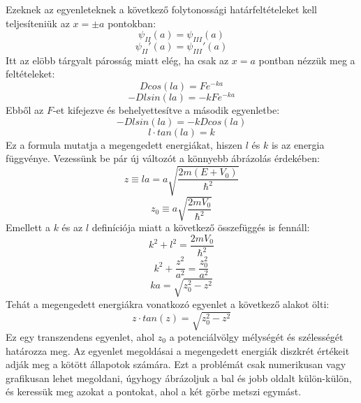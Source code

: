 \documentclass[a4paper,12pt]{article}
\begin{document}
Ezeknek az egyenleteknek a következő folytonossági határfeltételeket kell teljesíteniük az $x = \pm a$ pontokban:
\begin{equation}
    \psi_{II}(a) = \psi_{III}(a)
\end{equation}
\begin{equation}
    \psi_{II}'(a) = \psi_{III}'(a)
\end{equation}
Itt az elöbb tárgyalt párosság miatt elég, ha csak az $x = a$ pontban nézzük meg a feltételeket:
\begin{equation}
    D cos(l a) = F e^{- k a}
\end{equation}
\begin{equation}
    - D l sin(l a) = - k F e^{- k a}
\end{equation}
Ebből az $F$-et kifejezve és behelyettesítve a második egyenletbe:
\begin{equation}
    - D l sin(l a) = - k D cos(l a)
\end{equation}
\begin{equation}
    l \cdot tan(l a) = k
\end{equation}
Ez a formula mutatja a megengedett energiákat, hiszen $l$ és $k$ is az energia függvénye. Vezessünk be pár új változót a könnyebb ábrázolás érdekében:
\begin{equation}
    z \equiv l a = a \sqrt{\frac{2m(E + V_0)}{\hbar^2}}
\end{equation}
\begin{equation}
    z_0 \equiv a \sqrt{\frac{2m V_0}{\hbar^2}}
\end{equation}
Emellett a $k$ és az $l$ definíciója miatt a következő összefüggés is fennáll:
\begin{equation}
    k^2 + l^2 = \frac{2m V_0}{\hbar^2}
\end{equation}
\begin{equation}
    k^2 + \frac{z^2}{a^2} = \frac{z_0^2}{a^2}
\end{equation}
\begin{equation}
    ka = \sqrt{z_0^2 - z^2}
\end{equation}
Tehát a megengedett energiákra vonatkozó egyenlet a következő alakot ölti:
\begin{equation}
    z \cdot tan(z) = \sqrt{z_0^2 - z^2}
\end{equation}
Ez egy transzendens egyenlet, ahol $z_0$ a potenciálvölgy mélységét és szélességét határozza meg. Az egyenlet megoldásai a megengedett energiák diszkrét értékeit adják meg a kötött állapotok számára. 
Ezt a problémát csak numerikusan vagy grafikusan lehet megoldani, úgyhogy ábrázoljuk a bal és jobb oldalt külön-külön, és keressük meg azokat a pontokat, ahol a két görbe metszi egymást.
\end{document}
